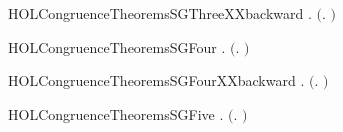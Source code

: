 \begin{SaveVerbatim}{HOLCongruenceTheoremsSGThreeXXbackward}
\HOLTokenTurnstile{} \HOLSymConst{\HOLTokenForall{}}.  \ensuremath{(}\HOLTokenLambda{}. \HOLConst{\ensuremath{\tau}}\HOLSymConst{\ensuremath{\ldotp}} \ensuremath{)} \HOLSymConst{\HOLTokenImp{}}  
\end{SaveVerbatim}
\newcommand{\HOLCongruenceTheoremsSGThreeXXbackward}{\UseVerbatim{HOLCongruenceTheoremsSGThreeXXbackward}}
\begin{SaveVerbatim}{HOLCongruenceTheoremsSGFour}
\HOLTokenTurnstile{} \HOLSymConst{\HOLTokenForall{}} .   \HOLSymConst{\HOLTokenConj{}}   \HOLSymConst{\HOLTokenImp{}}  \ensuremath{(}\HOLTokenLambda{}.   \HOLSymConst{\ensuremath{+}}  \ensuremath{)}
\end{SaveVerbatim}
\newcommand{\HOLCongruenceTheoremsSGFour}{\UseVerbatim{HOLCongruenceTheoremsSGFour}}
\begin{SaveVerbatim}{HOLCongruenceTheoremsSGFourXXbackward}
\HOLTokenTurnstile{} \HOLSymConst{\HOLTokenForall{}} .  \ensuremath{(}\HOLTokenLambda{}.   \HOLSymConst{\ensuremath{+}}  \ensuremath{)} \HOLSymConst{\HOLTokenImp{}}   \HOLSymConst{\HOLTokenConj{}}  
\end{SaveVerbatim}
\newcommand{\HOLCongruenceTheoremsSGFourXXbackward}{\UseVerbatim{HOLCongruenceTheoremsSGFourXXbackward}}
\begin{SaveVerbatim}{HOLCongruenceTheoremsSGFive}
\HOLTokenTurnstile{} \HOLSymConst{\HOLTokenForall{}} .   \HOLSymConst{\HOLTokenConj{}}   \HOLSymConst{\HOLTokenImp{}}  \ensuremath{(}\HOLTokenLambda{}.   \HOLSymConst{\ensuremath{\mid}}  \ensuremath{)}
\end{SaveVerbatim}
\newcommand{\HOLCongruenceTheoremsSGFive}{\UseVerbatim{HOLCongruenceTheoremsSGFive}}

